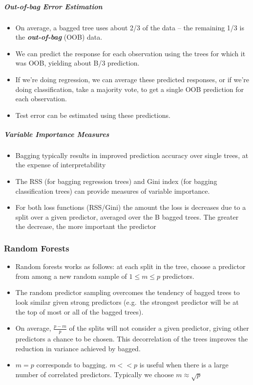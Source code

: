 \documentclass[11pt]{article}
\providecommand{\tightlist}{%
      \setlength{\itemsep}{0pt}\setlength{\parskip}{0pt}}
\begin{document}
    \hypertarget{out-of-bag-error-estimation}{%
\subparagraph{Out-of-bag Error
Estimation}\label{out-of-bag-error-estimation}}

    \begin{itemize}
\tightlist
\item
  On average, a bagged tree uses about 2/3 of the data -- the remaining
  1/3 is the \textbf{\emph{out-of-bag}} (OOB) data.
\item
  We can predict the response for each observation using the trees for
  which it was OOB, yielding about B/3 prediction.
\item
  If we're doing regression, we can average these predicted responses,
  or if we're doing classification, take a majority vote, to get a
  single OOB prediction for each observation.
\item
  Test error can be estimated using these predictions.
\end{itemize}

    \hypertarget{variable-importance-measures}{%
\subparagraph{Variable Importance
Measures}\label{variable-importance-measures}}

    \begin{itemize}
\tightlist
\item
  Bagging typically results in improved prediction accuracy over single
  trees, at the expense of interpretability
\item
  The RSS (for bagging regression trees) and Gini index (for bagging
  classification trees) can provide measures of variable importance.
\item
  For both loss functions (RSS/Gini) the amount the loss is decreases
  due to a split over a given predictor, averaged over the B bagged
  trees. The greater the decrease, the more important the predictor
\end{itemize}

    \hypertarget{random-forests}{%
\subsubsection{Random Forests}\label{random-forests}}

    \begin{itemize}
\tightlist
\item
  Random forests works as follows: at each split in the tree, choose a
  predictor from among a new random sample of
  \(1 \leqslant m \leqslant p\) predictors.
\item
  The random predictor sampling overcomes the tendency of bagged trees
  to look similar given strong predictors (e.g.~the strongest predictor
  will be at the top of most or all of the bagged trees).
\item
  On average, \(\frac{p-m}{p}\) of the splits will not consider a given
  predictor, giving other predictors a chance to be chosen. This
  decorrelation of the trees improves the reduction in variance achieved
  by bagged.
\item
  \(m=p\) corresponds to bagging. \(m << p\) is useful when there is a
  large number of correlated predictors. Typically we choose
  \(m \approx \sqrt{p}\)
\end{itemize}
\end{document}
